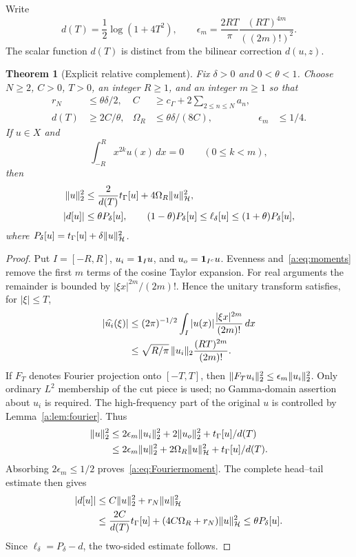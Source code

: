 \documentclass[11pt,a4paper]{article}
\numberwithin{equation}{section}
\newtheorem{theorem}{Theorem}[section]
\theoremstyle{definition}\newtheorem{definition}[theorem]{Definition}
\theoremstyle{remark}\newtheorem{remark}[theorem]{Remark}
\newcommand{\Hh}{\mathcal H}\newcommand{\Hw}{\mathcal H}
\newcommand{\tg}{t_\Gamma}\newcommand{\cg}{c_\Gamma}
\begin{document}
Write
\[
 d(T)=\frac12\log(1+4T^2),\qquad
 \epsilon_m=\frac{2RT}{\pi}\frac{(RT)^{4m}}{((2m)!)^2}.
\]
The scalar function $d(T)$ is distinct from the bilinear correction $d(u,z)$.

\begin{theorem}[Explicit relative complement]\label{a:thm:moment}
Fix $\delta>0$ and $0<\theta<1$. Choose $N\ge2$, $C>0$, $T>0$, an integer $R\ge1$, and an integer $m\ge1$ so that
\begin{align}
 r_N&\le\theta\delta/2,&
 C&\ge\cg+2\sum_{2\le n\le N}a_n,\label{a:eq:choices1}\\
 d(T)&\ge2C/\theta,&
 \Omega_R&\le\theta\delta/(8C),&
 \epsilon_m&\le1/4.\label{a:eq:choices2}
\end{align}
If $u\in X$ and
\begin{equation}\label{a:eq:moments}
 \int_{-R}^Rx^{2k}u(x)\,dx=0\qquad(0\le k<m),
\end{equation}
then
\begin{align}
 \norm u_2^2&\le\frac2{d(T)}\tg[u]+4\Omega_R\norm u_{\Hh}^2,
                   \label{a:eq:Fouriermoment}\\
 |d[u]|&\le\theta P_\delta[u],\qquad
 (1-\theta)P_\delta[u]\le\ell_\delta[u]
                \le(1+\theta)P_\delta[u],\label{a:eq:relative}
\end{align}
where $P_\delta[u]=\tg[u]+\delta\norm u_{\Hh}^2$.
\end{theorem}
\begin{proof}
Put $I=[-R,R]$, $u_i=\mathbf1_Iu$, and $u_o=\mathbf1_{I^c}u$. Evenness and~\eqref{a:eq:moments} remove the first $m$ terms of the cosine Taylor expansion. For real arguments the remainder is bounded by $|\xi x|^{2m}/(2m)!$. Hence the unitary transform satisfies, for $|\xi|\le T$,
\begin{align*}
 |\widehat{u_i}(\xi)|
 &\le(2\pi)^{-1/2}\int_I|u(x)|\frac{|\xi x|^{2m}}{(2m)!}\,dx\\
 &\le\sqrt{R/\pi}\,\lVert u_i\rVert_2\frac{(RT)^{2m}}{(2m)!}.
\end{align*}
If $F_T$ denotes Fourier projection onto $[-T,T]$, then
$\lVert F_Tu_i\rVert_2^2\le\epsilon_m\lVert u_i\rVert_2^2$.
Only ordinary $L^2$ membership of the cut piece is used; no Gamma-domain assertion about $u_i$ is required. The high-frequency part of the original $u$ is controlled by Lemma~\ref{a:lem:fourier}. Thus
\begin{align*}
 \norm u_2^2
 &\le2\epsilon_m\norm{u_i}_2^2+2\norm{u_o}_2^2
                     +\tg[u]/d(T)\\
 &\le2\epsilon_m\norm u_2^2+2\Omega_R\norm u_{\Hh}^2
                     +\tg[u]/d(T).
\end{align*}
Absorbing $2\epsilon_m\le1/2$ proves~\eqref{a:eq:Fouriermoment}.
The complete head--tail estimate then gives
\begin{align*}
 |d[u]|&\le C\norm u_2^2+r_N\norm u_{\Hh}^2\\
 &\le\frac{2C}{d(T)}\tg[u]+(4C\Omega_R+r_N)\norm u_{\Hh}^2
 \le\theta P_\delta[u].
\end{align*}
Since $\ell_\delta=P_\delta-d$, the two-sided estimate follows.
\end{proof}
\end{document}
